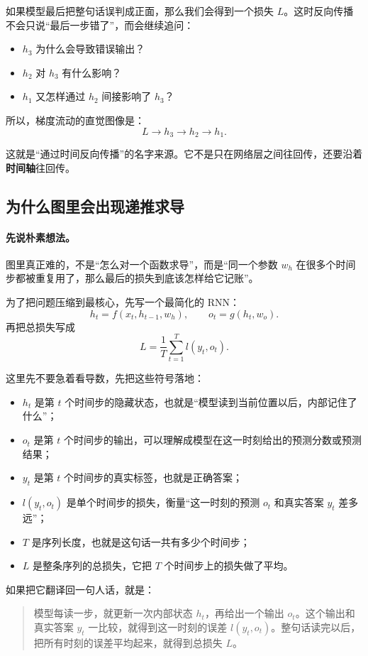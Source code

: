 \documentclass[12pt,a4paper]{ctexart}
\begin{document}
如果模型最后把整句话误判成正面，那么我们会得到一个损失 \(L\)。这时反向传播不会只说“最后一步错了”，而会继续追问：

\begin{itemize}
  \item \(h_3\) 为什么会导致错误输出？
  \item \(h_2\) 对 \(h_3\) 有什么影响？
  \item \(h_1\) 又怎样通过 \(h_2\) 间接影响了 \(h_3\)？
\end{itemize}

所以，梯度流动的直觉图像是：
\[
L \longrightarrow h_3 \longrightarrow h_2 \longrightarrow h_1.
\]

这就是“通过时间反向传播”的名字来源。它不是只在网络层之间往回传，还要沿着\textbf{时间轴}往回传。

\subsection{为什么图里会出现递推求导}

\paragraph{先说朴素想法。}
图里真正难的，不是“怎么对一个函数求导”，而是“同一个参数 \(w_h\) 在很多个时间步都被重复用了，那么最后的损失到底该怎样给它记账”。

为了把问题压缩到最核心，先写一个最简化的 RNN：
\[
h_t = f(x_t, h_{t-1}, w_h), \qquad
o_t = g(h_t, w_o).
\]
再把总损失写成
\[
L = \frac{1}{T}\sum_{t=1}^{T} l(y_t, o_t).
\]

这里先不要急着看导数，先把这些符号落地：
\begin{itemize}
  \item \(h_t\) 是第 \(t\) 个时间步的隐藏状态，也就是“模型读到当前位置以后，内部记住了什么”；
  \item \(o_t\) 是第 \(t\) 个时间步的输出，可以理解成模型在这一时刻给出的预测分数或预测结果；
  \item \(y_t\) 是第 \(t\) 个时间步的真实标签，也就是正确答案；
  \item \(l(y_t, o_t)\) 是单个时间步的损失，衡量“这一时刻的预测 \(o_t\) 和真实答案 \(y_t\) 差多远”；
  \item \(T\) 是序列长度，也就是这句话一共有多少个时间步；
  \item \(L\) 是整条序列的总损失，它把 \(T\) 个时间步上的损失做了平均。
\end{itemize}

如果把它翻译回一句人话，就是：
\begin{quote}
模型每读一步，就更新一次内部状态 \(h_t\)，再给出一个输出 \(o_t\)。这个输出和真实答案 \(y_t\) 一比较，就得到这一时刻的误差 \(l(y_t,o_t)\)。整句话读完以后，把所有时刻的误差平均起来，就得到总损失 \(L\)。
\end{quote}
\end{document}
